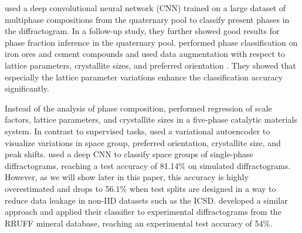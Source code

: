 \citeauthor{leeDeeplearningTechniquePhase2020} used a deep convolutional neural
network (CNN) trained on a large dataset of multiphase compositions from the
quaternary  pool to classify present phases in the
diffractogram\supercite{leeDeeplearningTechniquePhase2020}. In a follow-up
study, they further showed good results for phase fraction inference in the
quaternary  pool\supercite{leeDatadrivenXRDAnalysis2021}.
\citeauthor{schuetzkeEnhancingDeeplearningTraining2021} performed phase
classification on iron ores and cement compounds and used data augmentation with
respect to lattice parameters, crystallite sizes, and preferred orientation
\supercite{schuetzkeEnhancingDeeplearningTraining2021}. They showed that
especially the lattice parameter variations enhance the classification accuracy
significantly.

Instead of the analysis of phase composition,
\citeauthor{dongDeepConvolutionalNeural2021} performed regression of scale
factors, lattice parameters, and crystallite sizes in a five-phase catalytic
materials system\supercite{dongDeepConvolutionalNeural2021}. In contrast to
supervised tasks, \citeauthor{bankoDeepLearningVisualization2021} used a
variational autoencoder to visualize variations in space group, preferred
orientation, crystallite size, and peak
shifts\supercite{bankoDeepLearningVisualization2021}.
\citeauthor{parkClassificationCrystalStructure2017} used a deep CNN to classify
space groups of single-phase diffractograms, reaching a test accuracy of 81.14\%
on simulated diffractograms.\supercite{parkClassificationCrystalStructure2017}
However, as we will show later in this paper, this accuracy is highly overestimated and drops to 56.1\% when test splits are designed in a way to reduce data leakage in non-IID datasets such as the ICSD.
\citeauthor{vecseiNeuralNetworkBased2019}\supercite{vecseiNeuralNetworkBased2019} developed
a similar approach and applied their classifier to experimental diffractograms
from the RRUFF mineral database\supercite{lafuentePowerDatabasesRRUFF2015},
reaching an experimental test accuracy of 54\%.





